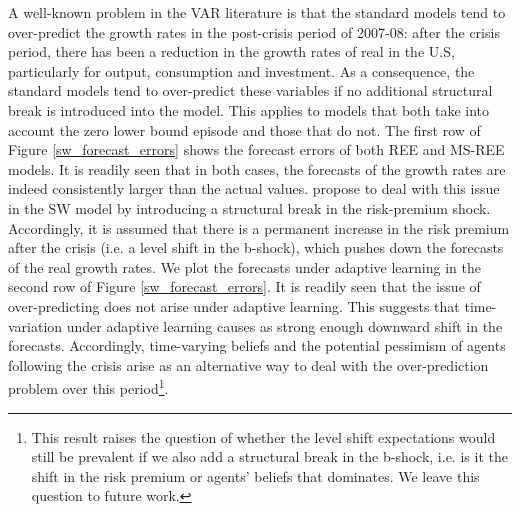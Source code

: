 \documentclass[12pt,reqno]{article}
\numberwithin{equation}{section}
\begin{document}
\noindent
A well-known problem in the VAR literature is that the standard models tend to over-predict the growth rates in the post-crisis period of 2007-08: after the crisis period, there has been a reduction in the growth rates of real in the U.S, particularly for output, consumption and investment. As a consequence, the standard models tend to over-predict these variables if no additional structural break is introduced into the model. This applies to models that both take into account the zero lower bound episode and those that do not. The first row of Figure \ref{sw_forecast_errors} shows the forecast errors of both REE and MS-REE models. It is readily seen that in both cases, the forecasts of the growth rates are indeed consistently larger than the actual values. \cite{linde2017estimation} propose to deal with this issue in the SW model by introducing a structural break in the risk-premium shock. Accordingly, it is assumed that there is a permanent increase in the risk premium after the crisis (i.e. a level shift in the b-shock), which pushes down the forecasts of the real growth rates. We plot the forecasts under adaptive learning in the second row of Figure \ref{sw_forecast_errors}. It is readily seen that the issue of over-predicting does not arise under adaptive learning. This suggests that time-variation under adaptive learning causes as strong enough downward shift in the forecasts. Accordingly, time-varying beliefs and the potential pessimism of agents following the crisis arise as an alternative way to deal with the over-prediction problem over this period\footnote{This result raises the question of whether the level shift expectations would still be prevalent if we also add a structural break in the b-shock, i.e. is it the shift in the risk premium or agents' beliefs that dominates. We leave this question to future work.}. \\
\end{document}

